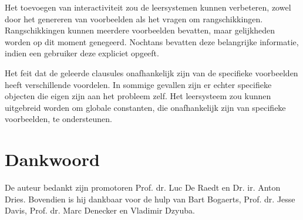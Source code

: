 Het toevoegen van interactiviteit zou de leersystemen kunnen verbeteren, zowel door het genereren van voorbeelden als het vragen om rangschikkingen.
Rangschikkingen kunnen meerdere voorbeelden bevatten, maar gelijkheden worden op dit moment genegeerd.
Nochtans bevatten deze belangrijke informatie, indien een gebruiker deze expliciet opgeeft.

Het feit dat de geleerde clausules onafhankelijk zijn van de specifieke voorbeelden heeft verschillende voordelen.
In sommige gevallen zijn er echter specifieke objecten die eigen zijn aan het probleem zelf.
Het leersysteem zou kunnen uitgebreid worden om globale constanten, die onafhankelijk zijn van specifieke voorbeelden, te ondersteunen. 



\section*{Dankwoord}
De auteur bedankt zijn promotoren Prof. dr. Luc De Raedt en Dr. ir. Anton Dries.
Bovendien is hij dankbaar voor de hulp van Bart Bogaerts, Prof. dr. Jesse Davis, Prof. dr. Marc Denecker en Vladimir Dzyuba.